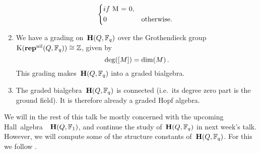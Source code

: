 \documentclass[a4paper,11pt]{scrartcl}
\begin{document}
\begin{enumerate}
\[\begin{cases*}
          if~$M = 0$,
          \\
          0
          &
          otherwise.
      \end{cases*}
    \]
  \item
    We have a grading on~$\mathbf{H}(Q, \mathbb{F}_q)$ over the Grothendieck group~$\operatorname{K}(\mathbf{rep}^{\mathrm{nil}}(Q, \mathbb{F}_q)) \cong \mathbb{Z}$, given by
    \[
      \deg( [M] )
      =
      \dim(M) \,.
    \]
    This grading makes~$\mathbf{H}(Q, \mathbb{F}_q)$ into a graded bialgebra.
  \item
    The graded bialgebra~$\mathbf{H}(Q, \mathbb{F}_q)$ is connected (i.e.\ its degree zero part is the ground field).
    It is therefore already a graded Hopf algebra.
\end{enumerate}

We will in the rest of this talk be mostly concerned with the upcoming Hall~algebra~~$\mathbf{H}(Q, \mathbb{F}_1)$, and continue the study of~$\mathbf{H}(Q, \mathbb{F}_q)$ in next week’s talk.
However, we will compute some of the structure constants of~$\mathbf{H}(Q, \mathbb{F}_q)$.
For this we follow \cite[Example~2.2]{schiffmann_hall}.
\end{document}
